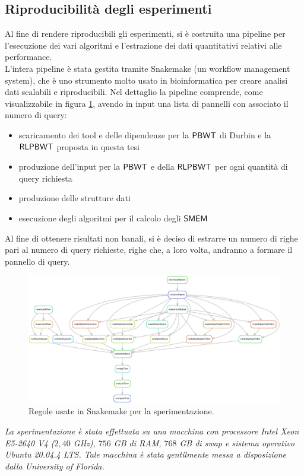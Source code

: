 \subsection{Riproducibilità degli esperimenti}
Al fine di rendere riproducibili gli esperimenti, si è costruita una pipeline
per l'esecuzione dei vari algoritmi e l'estrazione dei dati quantitativi
relativi alle performance.\\
L'intera pipeline è stata gestita tramite Snakemake \cite{snakemake}
(un workflow management system), che è uno strumento molto usato in
bioinformatica per creare analisi dati scalabili e riproducibili. Nel
dettaglio la pipeline comprende, come visualizzabile in figura \ref{fig:snake},
avendo in input una lista di pannelli con associato il numero di query:
\begin{itemize}
  \item scaricamento dei tool e delle dipendenze per la $\mbox{\rm {\sf PBWT}}$ di
  Durbin e la $\mbox{\rm {\sf RLPBWT}}$ proposta in questa tesi
  \item produzione dell'input per la $\mbox{\rm {\sf PBWT}}$ e della $\mbox{\rm {\sf RLPBWT}}$ per
  ogni quantità di query richiesta
  \item produzione delle strutture dati
  \item esecuzione degli algoritmi per il calcolo degli $\mbox{\rm {\sf SMEM}}$
\end{itemize}
Al fine di ottenere risultati non banali, si è deciso di estrarre un numero di
righe pari al numero di 
query richieste, righe che, a loro volta, andranno a formare il pannello di
query.\\
\begin{figure}
  \centering
  \includegraphics[width=\textwidth]{img/rules.pdf}
  \caption{Regole usate in Snakemake per la sperimentazione.}
  \label{fig:snake}
\end{figure}
\newline
\textit{La sperimentazione è stata effettuata su una macchina con processore
  Intel Xeon E5-2640 V4 ($2,40$ GHz), $756$ GB di RAM, $768$ GB di swap e
  sistema operativo Ubuntu 20.04.4 LTS. Tale macchina è stata gentilmente messa
  a disposizione dalla \emph{University of Florida}.}